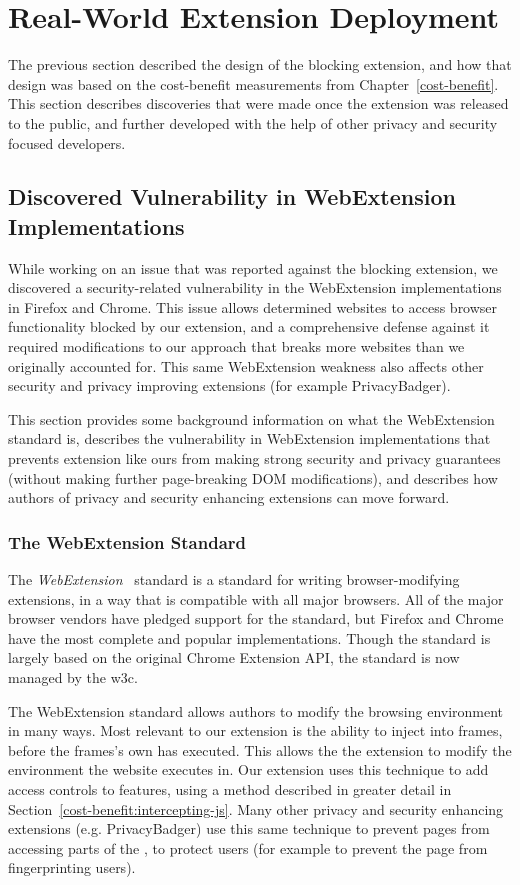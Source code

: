 \section{Real-World Extension Deployment}
\label{current-web:extension-deployment}

The previous section described the design of the \WAPI blocking extension, and
how that design was based on the cost-benefit measurements from
Chapter~\ref{cost-benefit}.  This section describes discoveries that were
made once the extension was released to the public, and further
developed with the help of other privacy and security focused developers.


\subsection{Discovered Vulnerability in WebExtension Implementations}
While working on an issue that was reported against the blocking extension,
we discovered a security-related vulnerability in the WebExtension implementations
in Firefox and Chrome.  This issue allows determined websites to access browser
functionality blocked by our extension, and a comprehensive defense against
it required modifications to our approach that breaks more websites than
we originally accounted for.  This same WebExtension weakness also affects
other security and privacy improving extensions (for example PrivacyBadger).

This section provides some background information on what the WebExtension
standard is, describes the vulnerability in WebExtension implementations that
prevents extension like ours from making strong security and privacy guarantees
(without making further page-breaking DOM modifications), and describes how
authors of privacy and security enhancing extensions can move forward.


\subsubsection{The WebExtension Standard}
The \textit{WebExtension}~\cite{webext2018standard} standard is a standard
for writing browser-modifying extensions, in a way that is compatible
with all major browsers.  All of the major browser vendors have pledged
support for the standard, but Firefox and Chrome have the most complete
and popular implementations.  Though the standard is largely based on
the original Chrome Extension API, the standard is now managed by the \gls{w3c}.

The WebExtension standard allows authors to modify the browsing environment
in many ways.  Most relevant to our extension is the ability to inject
\JS into frames, before the frames's own \JS has executed.  This allows the
the extension to modify the environment the website executes in.  Our extension
uses this technique to add access controls to \WAPI features, using a method
described in greater detail in Section~\ref{cost-benefit:intercepting-js}.
Many other privacy and security enhancing extensions (e.g. PrivacyBadger) use
this same technique to prevent pages from accessing parts of the \WAPI, to
protect users (for example to prevent the page from fingerprinting users).


